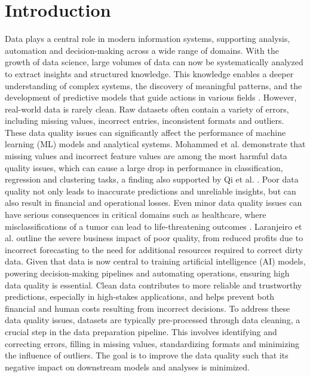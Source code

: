 \chapter{Introduction}
Data plays a central role in modern information systems, supporting analysis, automation and decision-making across a wide range of domains.
With the growth of data science, large volumes of data can now be systematically analyzed to extract insights and structured knowledge.
This knowledge enables a deeper understanding of complex systems, the discovery of meaningful patterns, and the development of predictive models that guide actions in various fields \cite{PAPER1}.
\newline\newline
However, real-world data is rarely clean. 
Raw datasets often contain a variety of errors, including missing values, incorrect entries, inconsistent formats and outliers. 
These data quality issues can significantly affect the performance of machine learning (ML) models and analytical systems. 
Mohammed et al. \cite{PAPER2} demonstrate that missing values and incorrect feature values are among the most harmful data quality issues, which can cause a large drop in performance in classification, regression and clustering tasks, a finding also supported by Qi et al. \cite{PAPER4}. 
Poor data quality not only leads to inaccurate predictions and unreliable insights, but can also result in financial and operational losses. 
Even minor data quality issues can have serious consequences in critical domains such as healthcare, where misclassifications of a tumor can lead to life-threatening outcomes \cite{PAPER2}. 
Laranjeiro et al. \cite{PAPER3} outline the severe business impact of poor quality, from reduced profits due to incorrect forecasting to the need for additional resources required to correct dirty data. 
Given that data is now central to training artificial intelligence (AI) models, powering decision-making pipelines and automating operations, ensuring high data quality is essential. 
Clean data contributes to more reliable and trustworthy predictions, especially in high-stakes applications, and helps prevent both financial and human costs resulting from incorrect decisions. 
\newline\newline
To address these data quality issues, datasets are typically pre-processed through data cleaning, a crucial step in the data preparation pipeline. 
This involves identifying and correcting errors, filling in missing values, standardizing formats and minimizing the influence of outliers. 
The goal is to improve the data quality such that its negative impact on downstream models and analyses is minimized.

